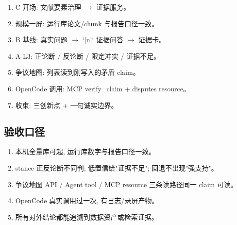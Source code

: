 \begin{enumerate}
  \item C 开场: 文献要素治理 $\rightarrow$ 证据服务。
  \item 规模一屏: 运行库论文/chunk 与报告口径一致。
  \item B 基线: 真实问题 $\rightarrow$ `[n]` 证据问答 $\rightarrow$ 证据卡。
  \item A L3: 正论断 / 反论断 / 限定冲突 / 证据不足。
  \item 争议地图: 列表读到刚写入的矛盾 claim。
  \item OpenCode 调用: MCP verify\_claim + disputes resource。
  \item 收束: 三创新点 + 一句诚实边界。
\end{enumerate}

\subsection{验收口径}

\begin{enumerate}
  \item 本机全量库可起, 运行库数字与报告口径一致。
  \item stance 正反论断不同判; 低置信给"证据不足"; 回退不出现"强支持"。
  \item 争议地图 API / Agent tool / MCP resource 三条读路径同一 claim 可读。
  \item OpenCode 真实调用过一次, 有日志/录屏产物。
  \item 所有对外结论都能追溯到数据资产或检索证据。
\end{enumerate}

\clearpage